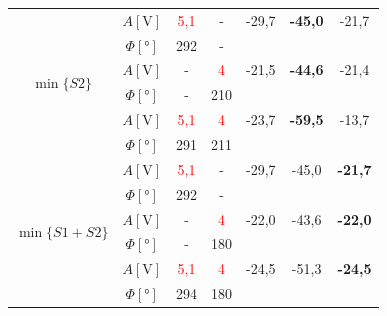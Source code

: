 \documentclass[polish,a4paper,11pt]{mwart}
\begin{document}
\begin{table}[!tbh]
\begin{tabular}{|c|c|c|c|c|c|c|}
    \multirow{6}{*}{$\min\{S2\}$}      &   $A [\si{\V}]$ & \textcolor{red}{5,1} & - & -29,7 & \textbf{-45,0} & -21,7 \\\cline{2-7}
				       &$\Phi [\si{\degree}]$ & 292 & - & \multicolumn{3}{c}{}\\\cline{2-7}
				       &   $A [\si{\V}]$ & - & \textcolor{red}{4} & -21,5 & \textbf{-44,6} & -21,4 \\\cline{2-7}
				       &$\Phi [\si{\degree}]$ & - & 210 & \multicolumn{3}{c}{}\\\cline{2-7}
				       &   $A [\si{\V}]$ & \textcolor{red}{5,1} & \textcolor{red}{4} & -23,7 & \textbf{-59,5} & -13,7\\\cline{2-7}
				       &$\Phi [\si{\degree}]$ & 291 & 211 & \multicolumn{3}{c}{}\\\hline
    \multirow{6}{*}{$\min\{S1+S2\}$}   &   $A [\si{\V}]$ & \textcolor{red}{5,1} & - & -29,7 & -45,0 & \textbf{-21,7}\\\cline{2-7}
				       &$\Phi [\si{\degree}]$ & 292 & - & \multicolumn{3}{c}{}\\\cline{2-7}
				       &   $A [\si{\V}]$ & - & \textcolor{red}{4} & -22,0 & -43,6 & \textbf{-22,0} \\\cline{2-7}
				       &$\Phi [\si{\degree}]$ & - & 180 & \multicolumn{3}{c}{}\\\cline{2-7}
				       &   $A [\si{\V}]$ & \textcolor{red}{5,1} & \textcolor{red}{4} & -24,5 & -51,3 & \textbf{-24,5} \\\cline{2-7}
				       &$\Phi [\si{\degree}]$ & 294 & 180 & \multicolumn{3}{c}{}\\\cline{1-4}
  \end{tabular}
\end{table}
\end{document}

